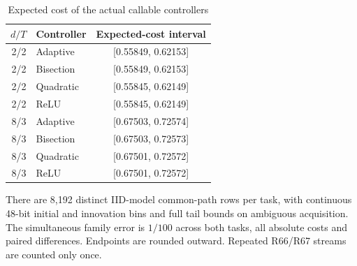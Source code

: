 \begin{table}[htbp]
\centering
\caption{Expected cost of the actual callable controllers}\label{tab:cost67}
{\small\setlength{\tabcolsep}{4pt}
\begin{tabular}{rlc}
\toprule
$d/T$ & Controller & Expected-cost interval \\
\midrule
2/2 & Adaptive & [0.55849, 0.62153] \\
2/2 & Bisection & [0.55849, 0.62153] \\
2/2 & Quadratic & [0.55845, 0.62149] \\
2/2 & ReLU & [0.55845, 0.62149] \\
8/3 & Adaptive & [0.67503, 0.72574] \\
8/3 & Bisection & [0.67503, 0.72573] \\
8/3 & Quadratic & [0.67501, 0.72572] \\
8/3 & ReLU & [0.67501, 0.72572] \\
\bottomrule
\end{tabular}}
\par\smallskip
{\footnotesize There are 8,192 distinct IID-model common-path rows per task, with continuous 48-bit initial and innovation bins and full tail bounds on ambiguous acquisition. The simultaneous family error is $1/100$ across both tasks, all absolute costs and paired differences. Endpoints are rounded outward. Repeated R66/R67 streams are counted only once.}
\end{table}
